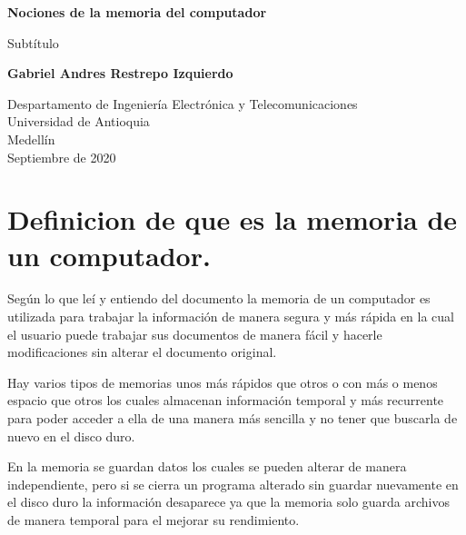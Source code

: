\documentclass{article}
\begin{document}
\begin{titlepage}
    \begin{center}
        \vspace*{1cm}
            
        \Huge
        \textbf{Nociones de la memoria del computador}
            
        \vspace{0.5cm}
        \LARGE
        Subtítulo
            
        \vspace{1.5cm}
            
        \textbf{Gabriel Andres Restrepo Izquierdo}
            
        \vfill
            
        \vspace{0.8cm}
            
        \Large
        Despartamento de Ingeniería Electrónica y Telecomunicaciones\\
        Universidad de Antioquia\\
        Medellín\\
        Septiembre de 2020
            
    \end{center}
\end{titlepage}

\tableofcontents

\newpage

\section{Definicion de que es la memoria de un computador.}
Según lo que leí y entiendo del documento la memoria de un computador es utilizada para trabajar la información de manera segura y más rápida en la cual el usuario puede trabajar sus documentos de manera fácil y hacerle modificaciones sin alterar el documento original.

Hay varios tipos de memorias unos más rápidos que otros o con más o menos espacio que otros los cuales almacenan información temporal y más recurrente para poder acceder a ella de una manera más sencilla y no tener que buscarla de nuevo en el disco duro.

En la memoria se guardan datos los cuales se pueden alterar de manera independiente, pero si se cierra un programa alterado sin guardar nuevamente en el disco duro la información desaparece ya que la memoria solo guarda archivos de manera temporal para el mejorar su rendimiento.  
\end{document}
